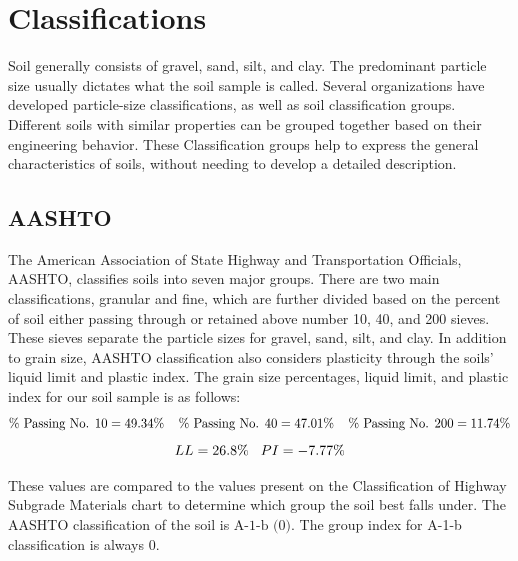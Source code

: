 \documentclass{article}
\begin{document}
\newpage
\section{Classifications}
\par Soil generally consists of gravel, sand, silt, and clay. The predominant particle size usually dictates what the soil sample is called. Several organizations have developed particle-size classifications, as well as soil classification groups. Different soils with similar properties can be grouped together based on their engineering behavior. These Classification groups help to express the general characteristics of soils, without needing to develop a detailed description.  
\subsection{AASHTO}
\par The American Association of State Highway and Transportation Officials, AASHTO, classifies soils into seven major groups. There are two main classifications, granular and fine, which are further divided based on the percent of soil either passing through or retained above number 10, 40, and 200 sieves. These sieves separate the particle sizes for gravel, sand, silt, and clay. In addition to grain size, AASHTO classification also considers plasticity through the soils' liquid limit and plastic index. The grain size percentages, liquid limit, and plastic index for our soil sample is as follows:  
\[\% \text{ Passing No. 10}=49.34\%\hspace{4mm}\% \text{ Passing No. 40}=47.01\%\hspace{4mm}\% \text{ Passing No. 200}=11.74\%\]
\[LL=26.8\%\hspace{3mm}PI=-7.77\%\] 

\par These values are compared to the values present on the Classification of Highway Subgrade Materials chart to determine which group the soil best falls under. The AASHTO classification of the soil is $\boxed{\text{A-1-b (0)}}$. The group index for A-1-b classification is always 0. 
\end{document}
